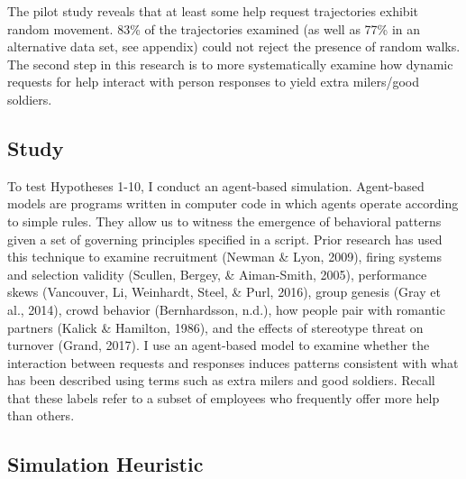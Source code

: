 \documentclass[english,,man]{apa6}
\begin{document}
The pilot study reveals that at least some help request trajectories exhibit random movement. 83\% of the trajectories examined (as well as 77\% in an alternative data set, see appendix) could not reject the presence of random walks. The second step in this research is to more systematically examine how dynamic requests for help interact with person responses to yield extra milers/good soldiers.

\hypertarget{study}{%
\subsection{Study}\label{study}}

To test Hypotheses 1-10, I conduct an agent-based simulation. Agent-based models are programs written in computer code in which agents operate according to simple rules. They allow us to witness the emergence of behavioral patterns given a set of governing principles specified in a script. Prior research has used this technique to examine recruitment (Newman \& Lyon, 2009), firing systems and selection validity (Scullen, Bergey, \& Aiman-Smith, 2005), performance skews (Vancouver, Li, Weinhardt, Steel, \& Purl, 2016), group genesis (Gray et al., 2014), crowd behavior (Bernhardsson, n.d.), how people pair with romantic partners (Kalick \& Hamilton, 1986), and the effects of stereotype threat on turnover (Grand, 2017). I use an agent-based model to examine whether the interaction between requests and responses induces patterns consistent with what has been described using terms such as extra milers and good soldiers. Recall that these labels refer to a subset of employees who frequently offer more help than others.

\hypertarget{simulation-heuristic}{%
\subsection{Simulation Heuristic}\label{simulation-heuristic}}
\end{document}
